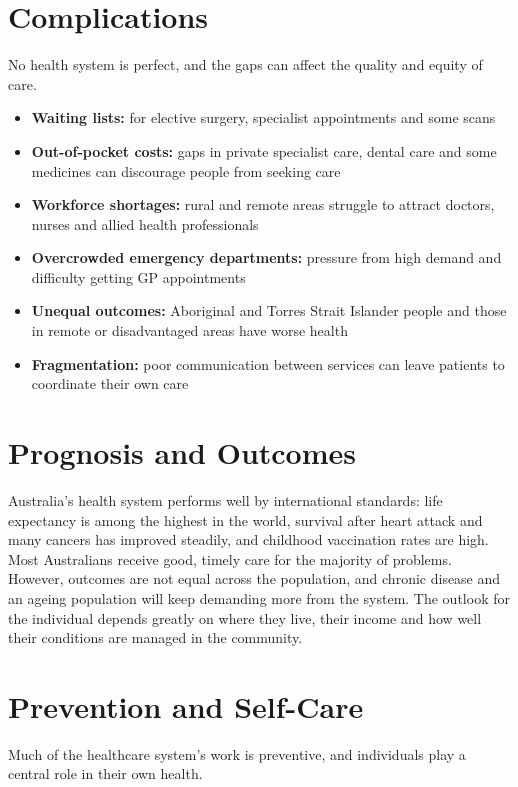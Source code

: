 \section*{Complications}
No health system is perfect, and the gaps can affect the quality and equity of care.

\begin{itemize}
    \item \textbf{Waiting lists:} for elective surgery, specialist appointments and some scans
    \item \textbf{Out-of-pocket costs:} gaps in private specialist care, dental care and some medicines can discourage people from seeking care
    \item \textbf{Workforce shortages:} rural and remote areas struggle to attract doctors, nurses and allied health professionals
    \item \textbf{Overcrowded emergency departments:} pressure from high demand and difficulty getting GP appointments
    \item \textbf{Unequal outcomes:} Aboriginal and Torres Strait Islander people and those in remote or disadvantaged areas have worse health
    \item \textbf{Fragmentation:} poor communication between services can leave patients to coordinate their own care
\end{itemize}

\section*{Prognosis and Outcomes}
Australia's health system performs well by international standards: life expectancy is among the highest in the world, survival after heart attack and many cancers has improved steadily, and childhood vaccination rates are high. Most Australians receive good, timely care for the majority of problems. However, outcomes are not equal across the population, and chronic disease and an ageing population will keep demanding more from the system. The outlook for the individual depends greatly on where they live, their income and how well their conditions are managed in the community.

\section*{Prevention and Self-Care}
Much of the healthcare system's work is preventive, and individuals play a central role in their own health.

